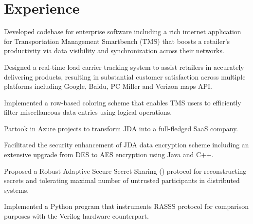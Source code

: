 \documentclass[]{deedy_format_Hien}
\begin{document}
\begin{minipage}[t]{0.66\textwidth} 
%
%


\section{Experience}
\vspace{5mm}
\justify
\begin{tightemize}
\item Developed codebase for enterprise software including a rich internet application for Transportation Management Smartbench (TMS) that boosts a retailer's productivity via data visibility and synchronization across their networks.
\item Designed a real-time load carrier tracking system to assist retailers in accurately delivering products, resulting in substantial customer satisfaction across multiple platforms including Google, Baidu, PC Miller and Verizon maps API. 
\item Implemented a row-based coloring scheme that enables TMS users to efficiently filter miscellaneous data entries using logical operations. 
\item Partook in Azure projects to transform JDA into a full-fledged SaaS company.  
\item Facilitated the security enhancement of JDA data encryption scheme including an extensive upgrade from DES to AES encryption using Java and C++.
\end{tightemize}
\vspace{\topsep}
\sectionsep

\vspace{1mm}
\justify
\begin{tightemize}
\item Proposed a Robust Adaptive Secure Secret Sharing () protocol for reconstructing secrets and tolerating maximal number of untrusted participants in distributed systems.
\item Implemented a Python program that instruments RASSS protocol for comparison purposes with the Verilog hardware counterpart.
\end{tightemize}
\vspace{\topsep}
\sectionsep


\end{minipage}
\end{document}
